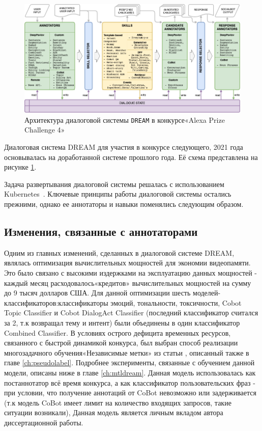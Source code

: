 \begin{figure}[ht]
  \includegraphics[width=\textwidth]{images/Alexa2_.png}
  \caption{Архитектура диалоговой системы \texttt{DREAM} в конкурсе«Alexa Prize Challenge 4»}\label{fig:Alexa2}
\end{figure}
Диалоговая система {DREAM} для участия в конкурсе следующего, 2021 года основывалась на доработанной системе прошлого года. Её схема представлена на рисунке \ref{fig:Alexa2}.


Задача развертывания диалоговой системы решалась с использованием Kubernetes~\cite{kubernetes}.
Ключевые принципы работы диалоговой системы остались прежними, однако ее аннотаторы и навыки поменялись следующим образом.

\subsection{Изменения, связанные с аннотаторами}\label{dream:2:ann}

Одним из главных изменений, сделанных в диалоговой системе DREAM, являлась оптимизация вычислительных мощностей для экономии видеопамяти. Это было связано с высокими издержками на эксплуатацию данных мощностей - каждый месяц расходовалось«кредитов» вычислительных мощностей на сумму до 9 тысяч долларов США. Для данной оптимизации шесть моделей-классификаторов:классификаторы эмоций, тональности, токсичности, Cobot Topic Classifier и Cobot DialogAct Classifier (последний классификатор считался за 2, т.к возвращал тему и интент) были объединены в один классификатор Combined Classifier. В условиях острого дефицита временных ресурсов, связанного с быстрой динамикой конкурса, был выбран способ реализации многозадачного обучения«Независимые метки» из статьи  \cite{pseudolabel}, описанный также в главе \ref{ch:pseudolabel}. Подробнее эксперименты, связанные с обучением данной модели, описаны ниже в главе \ref{ch:mtldream}. Данная модель использовалась как постаннотатор всё время конкурса, а как классификатор пользовательских фраз - при условии, что получение аннотаций от CoBot невозможно или задерживается (т.к модель CoBot имеет лимит на количество входящих запросов, такие ситуации возникали),  Данная модель является личным вкладом автора диссертационной работы.

